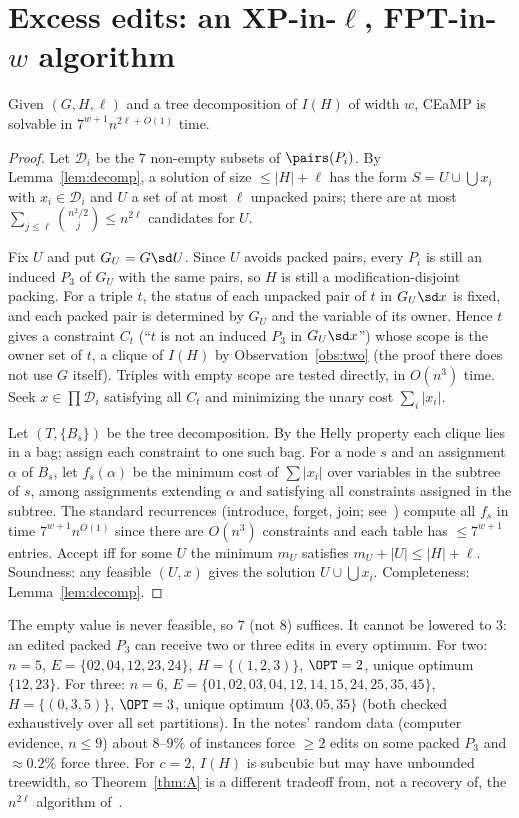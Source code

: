 \section{Excess edits: an XP-in-\texorpdfstring{$\ell$}{l}, FPT-in-\texorpdfstring{$w$}{w} algorithm}\label{sec:excess}
\begin{theorem}\label{thm:A}
Given $(G,H,\ell)$ and a tree decomposition of $I(H)$ of width $w$, CEaMP is solvable in $7^{w+1}n^{2\ell+O(1)}$ time.
\end{theorem}
\begin{proof}
Let $\mathcal D_i$ be the $7$ non-empty subsets of $\pairs(P_i)$. By Lemma~\ref{lem:decomp}, a solution of size $\le|H|+\ell$ has the form $S=U\cup\bigcup x_i$ with $x_i\in\mathcal D_i$ and $U$ a set of at most $\ell$ unpacked pairs; there are at most $\sum_{j\le\ell}\binom{n^2/2}{j}\le n^{2\ell}$ candidates for $U$.

Fix $U$ and put $G_U=G\sd U$. Since $U$ avoids packed pairs, every $P_i$ is still an induced $P_3$ of $G_U$ with the same pairs, so $H$ is still a modification-disjoint packing. For a triple $t$, the status of each unpacked pair of $t$ in $G_U\sd x$ is fixed, and each packed pair is determined by $G_U$ and the variable of its owner. Hence $t$ gives a constraint $C_t$ (``$t$ is not an induced $P_3$ in $G_U\sd x$'') whose scope is the owner set of $t$, a clique of $I(H)$ by Observation~\ref{obs:two} (the proof there does not use $G$ itself). Triples with empty scope are tested directly, in $O(n^3)$ time. Seek $x\in\prod\mathcal D_i$ satisfying all $C_t$ and minimizing the unary cost $\sum_i|x_i|$.

Let $(T,\{B_s\})$ be the tree decomposition. By the Helly property each clique lies in a bag; assign each constraint to one such bag. For a node $s$ and an assignment $\alpha$ of $B_s$, let $f_s(\alpha)$ be the minimum cost of $\sum|x_i|$ over variables in the subtree of $s$, among assignments extending $\alpha$ and satisfying all constraints assigned in the subtree. The standard recurrences (introduce, forget, join; see~\cite{Cygan15}) compute all $f_s$ in time $7^{w+1}n^{O(1)}$ since there are $O(n^3)$ constraints and each table has $\le7^{w+1}$ entries. Accept iff for some $U$ the minimum $m_U$ satisfies $m_U+|U|\le|H|+\ell$. Soundness: any feasible $(U,x)$ gives the solution $U\cup\bigcup x_i$. Completeness: Lemma~\ref{lem:decomp}.
\end{proof}
\begin{remark}
The empty value is never feasible, so $7$ (not $8$) suffices. It cannot be lowered to $3$: an edited packed $P_3$ can receive two or three edits in every optimum. For two: $n=5$, $E=\{02,04,12,23,24\}$, $H=\{(1,2,3)\}$, $\OPT=2$, unique optimum $\{12,23\}$. For three: $n=6$, $E=\{01,02,03,04,12,14,15,24,25,35,45\}$, $H=\{(0,3,5)\}$, $\OPT=3$, unique optimum $\{03,05,35\}$ (both checked exhaustively over all set partitions). In the notes' random data (computer evidence, $n\le9$) about $8$--$9\%$ of instances force $\ge2$ edits on some packed $P_3$ and $\approx0.2\%$ force three. For $c=2$, $I(H)$ is subcubic but may have unbounded treewidth, so Theorem~\ref{thm:A} is a different tradeoff from, not a recovery of, the $n^{2\ell}$ algorithm of~\cite{LPS23}.
\end{remark}
